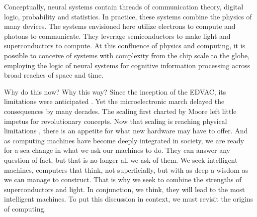 \documentclass[twocolumn]{article}
\begin{document}
Conceptually, neural systems contain threads of communication theory, digital logic, probability and statistics. In practice, these systems combine the physics of many devices. The systems envisioned here utilize electrons to compute and photons to communicate. They leverage semiconductors to make light and superconductors to compute. At this confluence of physics and computing, it is possible to conceive of systems with complexity from the chip scale to the globe, employing the logic of neural systems for cognitive information processing across broad reaches of space and time. 

Why do this now? Why this way? Since the inception of the EDVAC, its limitations were anticipated \cite{}. Yet the microelectronic march delayed the consequences by many decades. The scaling first charted by Moore \cite{} left little impetus for revolutionary concepts. Now that scaling is reaching physical limitations \cite{}, there is an appetite for what new hardware may have to offer. And as computing machines have become deeply integrated in society, we are ready for a sea change in what we ask our machines to do. They can answer any question of fact, but that is no longer all we ask of them. We seek intelligent machines, computers that think, not superficially, but with as deep a wisdom as we can manage to construct. That is why we seek to combine the strengths of superconductors and light. In conjunction, we think, they will lead to the most intelligent machines. To put this discussion in context, we must revisit the origins of computing.
\end{document}
